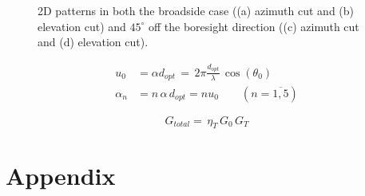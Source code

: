 \documentclass[12pt,a4paper,twocolumn]{article}
\begin{document}
{\begin{figure}
\begin{center}
\begin{subfigure}{0.25\linewidth}
	\caption{}
\end{subfigure}
\caption{2D patterns in both the broadside case ((a) azimuth cut and (b) elevation cut) and $45^\circ$ off the boresight direction ((c) azimuth cut and (d) elevation cut).}
\label{fig:pcb pifa array comparison}
	\end{center}
\end{figure}
\begin{equation}
	\begin{aligned}
		u_0&=\alpha d_{opt}\,=\,2\pi\frac{d_{opt}}{\lambda}\,\cos(\theta_0)\\
		\alpha_n&=n\,\alpha\,d_{opt}=nu_0\qquad \left(n=\overline{1,5}\right)
		\label{eq:phase coefficients}
	\end{aligned}
\end{equation}

\begin{equation}
	G_{total}=\,\eta_T\,G_0\,G_T
	\label{eq:pattern multiplication}
\end{equation}




\newpage 

\printbibliography

\section*{Appendix}
}
\end{document}
